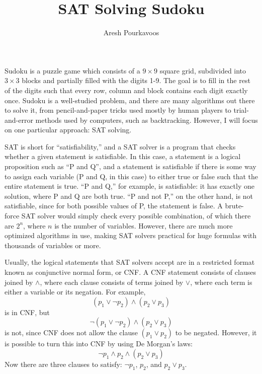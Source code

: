\documentclass{article}
\begin{document}
\title{SAT Solving Sudoku}
\author{Aresh Pourkavoos}
\maketitle

Sudoku is a puzzle game which consists of a $9 \times 9$ square grid,
subdivided into $3 \times 3$ blocks
and partially filled with the digits 1-9.
The goal is to fill in the rest of the digits such that
every row, column and block contains each digit exactly once.
Sudoku is a well-studied problem,
and there are many algorithms out there to solve it,
from pencil-and-paper tricks used mostly by human players
to trial-and-error methods used by computers, such as backtracking.
However, I will focus on one particular approach: SAT solving.

SAT is short for ``satisfiability,''
and a SAT solver is a program that checks
whether a given statement is satisfiable.
In this case, a statement is a logical proposition
such as ``P and Q'',
and a statement is satisfiable
if there is some way to assign each variable
(P and Q, in this case) to either true or false
such that the entire statement is true.
``P and Q,'' for example, is satisfiable:
it has exactly one solution, where P and Q are both true.
``P and not P,'' on the other hand, is not satisfiable,
since for both possible values of P, the statement is false.
A brute-force SAT solver would simply check every possible combination,
of which there are $2^n$, where $n$ is the number of variables.
However, there are much more optimized algorithms in use,
making SAT solvers practical for huge formulas with thousands of variables or more.

Usually, the logical statements that SAT solvers accept
are in a restricted format known as
conjunctive normal form, or CNF.
A CNF statement consists of clauses joined by $\land$,
where each clause consists of terms joined by $\lor$,
where each term is either a variable or its negation.
For example,
\[(p_1 \lor \lnot p_2) \land (p_2 \lor p_3)\]
is in CNF, but
\[\lnot (p_1 \lor \lnot p_2) \land (p_2 \lor p_3)\]
is not, since CNF does not allow the clause
$(p_1 \lor p_2)$ to be negated.
However, it is possible to turn this into CNF by using De Morgan's laws:
\[\lnot p_1 \land p_2 \land (p_2 \lor p_3)\]
Now there are three clauses to satisfy:
$\lnot p_1$, $p_2$, and $p_2 \lor p_3$.
\end{document}

